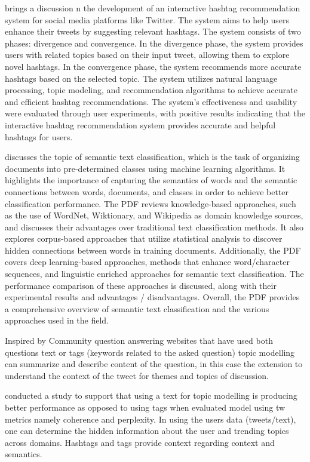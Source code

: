 \cite{alsini2021hashtag} brings a discussion n the development of an interactive hashtag recommendation system for social media platforms like Twitter. The system aims to help users enhance their tweets by suggesting relevant hashtags. The system consists of two phases: divergence and convergence. In the divergence phase, the system provides users with related topics based on their input tweet, allowing them to explore novel hashtags. In the convergence phase, the system recommends more accurate hashtags based on the selected topic. The system utilizes natural language processing, topic modeling, and recommendation algorithms to achieve accurate and efficient hashtag recommendations. The system's effectiveness and usability were evaluated through user experiments, with positive results indicating that the interactive hashtag recommendation system provides accurate and helpful hashtags for users.

\cite{altinel2018semantic} discusses the topic of semantic text classification, which is the task of organizing documents into pre-determined classes using machine learning algorithms. It highlights the importance of capturing the semantics of words and the semantic connections between words, documents, and classes in order to achieve better classification performance. The PDF reviews knowledge-based approaches, such as the use of WordNet, Wiktionary, and Wikipedia as domain knowledge sources, and discusses their advantages over traditional text classification methods. It also explores corpus-based approaches that utilize statistical analysis to discover hidden connections between words in training documents. Additionally, the PDF covers deep learning-based approaches, methods that enhance word/character sequences, and linguistic enriched approaches for semantic text classification. The performance comparison of these approaches is discussed, along with their experimental results and advantages / disadvantages. Overall, the PDF provides a comprehensive overview of semantic text classification and the various approaches used in the field.

Inspired by Community question answering websites that have used both questions text or tags (keywords related to the asked question) topic modelling can summarize and describe content of the question, in this case the extension to understand the context of the tweet for themes and topics of discussion.

\cite{prabha2023question} conducted a study to support that using a text for topic modelling is producing better performance as opposed to using tags when evaluated model using tw metrics namely coherence and perplexity.  In using the users data  (tweets/text), one can determine the hidden information about the user and trending topics across domains.  Hashtags and tags provide context regarding context and semantics.

